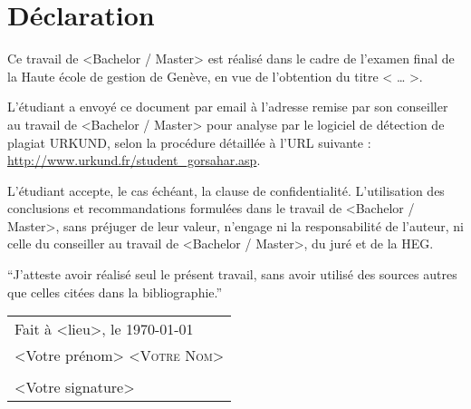 

\newpage

\section*{Déclaration}		%

Ce travail de <Bachelor / Master> est réalisé dans le cadre de l’examen final de la Haute école de gestion de Genève, en vue de l’obtention du titre < … >.

L’étudiant a envoyé ce document par email à l'adresse remise par son conseiller au travail de <Bachelor / Master> pour analyse par le logiciel de détection de plagiat URKUND, selon la procédure détaillée à l’URL suivante : \url{http://www.urkund.fr/student_gorsahar.asp}.

L’étudiant accepte, le cas échéant, la clause de confidentialité. L'utilisation des conclusions et recommandations formulées dans le travail de <Bachelor / Master>, sans préjuger de leur valeur, n'engage ni la responsabilité de l'auteur, ni celle du conseiller au travail de <Bachelor / Master>, du juré et de la HEG. \bigskip{}


\enquote{J’atteste avoir réalisé seul le présent travail, sans avoir utilisé
des sources autres que celles citées dans la bibliographie.} \vspace{3cm}


\noindent \begin{flushright}
\begin{tabular}{l}
Fait à <lieu>, le \today{}\tabularnewline
<Votre prénom> \textsc{<Votre Nom>}\tabularnewline
\tabularnewline
<Votre signature>		%
\end{tabular}
\par\end{flushright}


